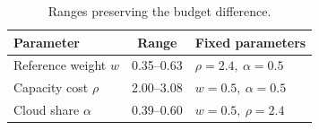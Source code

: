 \begin{table}[t]
\caption{Ranges preserving the budget difference.}
\label{tab:retail-sensitivity}
\centering\small
\begin{tabular}{@{}lcl@{}}
\toprule
Parameter & Range & Fixed parameters \\
\midrule
Reference weight $w$ & 0.35--0.63 & $\rho=2.4,\ \alpha=0.5$ \\
Capacity cost $\rho$ & 2.00--3.08 & $w=0.5,\ \alpha=0.5$ \\
Cloud share $\alpha$ & 0.39--0.60 & $w=0.5,\ \rho=2.4$ \\
\bottomrule
\end{tabular}
\end{table}

